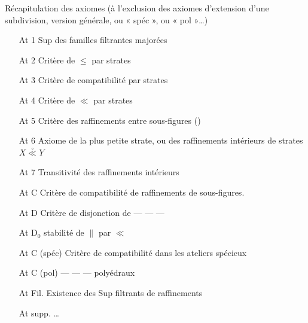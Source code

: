 \documentclass[11pt,a4paper]{article}
\begin{document}
Récapitulation des axiomes (à l'exclusion des \struck{\ill{}} axiomes d'extension d'une subdivision, version générale, ou « spéc », ou « pol »\ldots)

\begin{itemize}
  \item[At 1] Sup des familles filtrantes majorées
  \item[At 2] Critère de $\leq$ par strates
  \item[At 3] Critère de  compatibilité par strates
  \item[At 4] Critère de $\ll$ par strates
  \item[At 5] Critère des raffinements entre sous-figures (\ill{})
  \item[At 6] Axiome de la plus petite strate, ou des raffinements intérieurs de strates $X \mathrel{\overset{\circ}{\ll}} Y$
  \item[At 7] Transitivité des raffinements intérieurs
\end{itemize}
\marginal{$\leq$}

\begin{itemize}
  \item[At C] Critère de compatibilité de raffinements de sous-figures.
  \item[At D] Critère de disjonction de --- --- ---
  \item[At D$_0$]  stabilité de $\parallel$ par $\ll$
  \item[At C (spéc)] Critère de compatibilité dans les ateliers spécieux
  \item[At C (pol)] --- --- --- polyédraux
\end{itemize}

\begin{itemize}
  \item[At Fil.] Existence des Sup filtrants de  raffinements
  \item[At supp.] \ldots
\end{itemize}
\end{document}
